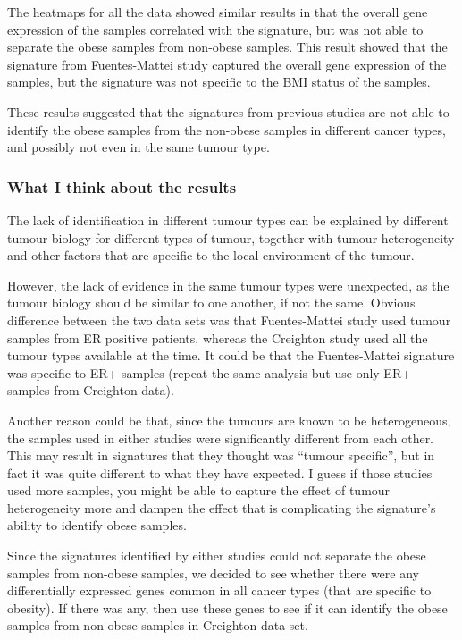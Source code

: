 \documentclass[a4paper, 11pt]{article}
\begin{document}
The heatmaps for all the data showed similar results in that the overall gene expression of the samples correlated with the signature, but was not able to separate the obese samples from non-obese samples.
This result showed that the signature from Fuentes-Mattei study captured the overall gene expression of the samples, but the signature was not specific to the BMI status of the samples.

These results suggested that the signatures from previous studies are not able to identify the obese samples from the non-obese samples in different cancer types, and possibly not even in the same tumour type.

\subsubsection*{What I think about the results}

The lack of identification in different tumour types can be explained by different tumour biology for different types of tumour, together with tumour heterogeneity and other factors that are specific to the local environment of the tumour.

However, the lack of evidence in the same tumour types were unexpected, as the tumour biology should be similar to one another, if not the same.
Obvious difference between the two data sets was that Fuentes-Mattei study used tumour samples from ER positive patients, whereas the Creighton study used all the tumour types available at the time.
It could be that the Fuentes-Mattei signature was specific to ER+ samples (repeat the same analysis but use only ER+ samples from Creighton data).

Another reason could be that, since the tumours are known to be heterogeneous, the samples used in either studies were significantly different from each other.
This may result in signatures that they thought was ``tumour specific'', but in fact it was quite different to what they have expected.
I guess if those studies used more samples, you might be able to capture the effect of tumour heterogeneity more and dampen the effect that is complicating the signature's ability to identify obese samples.\\

\newline

Since the signatures identified by either studies could not separate the obese samples from non-obese samples, we decided to see whether there were any differentially expressed genes common in all cancer types (that are specific to obesity).
If there was any, then use these genes to see if it can identify the obese samples from non-obese samples in Creighton data set.
\end{document}
